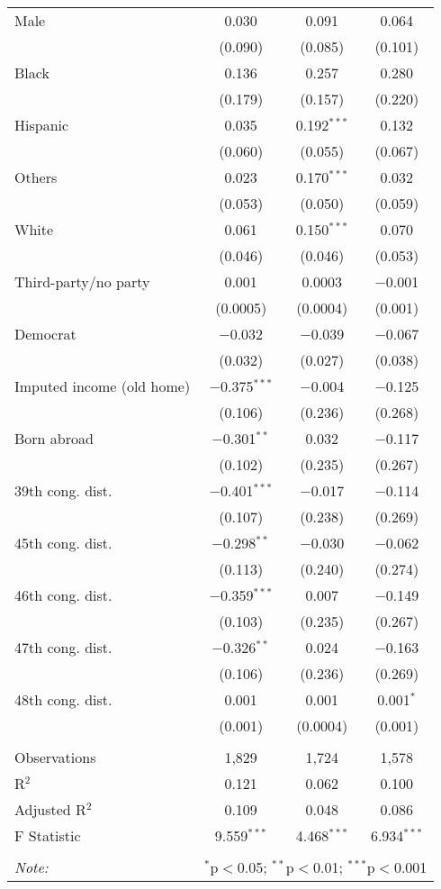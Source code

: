 \begin{tabular}{@{\extracolsep{5pt}}lccc}
  Male & 0.030 & 0.091 & 0.064 \\ 
  & (0.090) & (0.085) & (0.101) \\ 
  Black & 0.136 & 0.257 & 0.280 \\ 
  & (0.179) & (0.157) & (0.220) \\ 
  Hispanic & 0.035 & 0.192$^{***}$ & 0.132 \\ 
  & (0.060) & (0.055) & (0.067) \\ 
  Others & 0.023 & 0.170$^{***}$ & 0.032 \\ 
  & (0.053) & (0.050) & (0.059) \\ 
  White & 0.061 & 0.150$^{***}$ & 0.070 \\ 
  & (0.046) & (0.046) & (0.053) \\ 
  Third-party/no party & 0.001 & 0.0003 & $-$0.001 \\ 
  & (0.0005) & (0.0004) & (0.001) \\ 
  Democrat & $-$0.032 & $-$0.039 & $-$0.067 \\ 
  & (0.032) & (0.027) & (0.038) \\ 
  Imputed income (old home) & $-$0.375$^{***}$ & $-$0.004 & $-$0.125 \\ 
  & (0.106) & (0.236) & (0.268) \\ 
  Born abroad & $-$0.301$^{**}$ & 0.032 & $-$0.117 \\ 
  & (0.102) & (0.235) & (0.267) \\ 
  39th cong. dist. & $-$0.401$^{***}$ & $-$0.017 & $-$0.114 \\ 
  & (0.107) & (0.238) & (0.269) \\ 
  45th cong. dist. & $-$0.298$^{**}$ & $-$0.030 & $-$0.062 \\ 
  & (0.113) & (0.240) & (0.274) \\ 
  46th cong. dist. & $-$0.359$^{***}$ & 0.007 & $-$0.149 \\ 
  & (0.103) & (0.235) & (0.267) \\ 
  47th cong. dist. & $-$0.326$^{**}$ & 0.024 & $-$0.163 \\ 
  & (0.106) & (0.236) & (0.269) \\ 
  48th cong. dist. & 0.001 & 0.001 & 0.001$^{*}$ \\ 
  & (0.001) & (0.0004) & (0.001) \\ 
 \hline \\[-1.8ex] 
Observations & 1,829 & 1,724 & 1,578 \\ 
R$^{2}$ & 0.121 & 0.062 & 0.100 \\ 
Adjusted R$^{2}$ & 0.109 & 0.048 & 0.086 \\ 
F Statistic & 9.559$^{***}$ & 4.468$^{***}$ & 6.934$^{***}$ \\ 
\hline 
\hline \\[-1.8ex] 
\textit{Note:}  & \multicolumn{3}{r}{$^{*}$p$<$0.05; $^{**}$p$<$0.01; $^{***}$p$<$0.001} \\ 
\end{tabular} 
